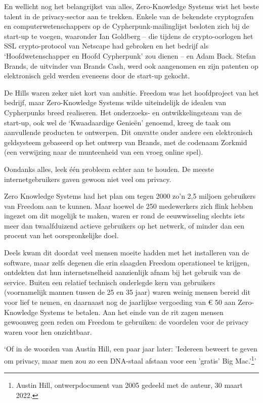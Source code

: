 \documentclass[
  a5paper,
  smalldemyvopaper,11pt,twoside,onecolumn,openright,extrafontsizes]{memoir}
\begin{document}
En wellicht nog het belangrijkst van alles, Zero-Knowledge Systems wist
het beste talent in de privacy-sector aan te trekken. Enkele van de
bekendste cryptografen en computerwetenschappers op de
Cypherpunk-mailinglijst besloten zich bij de start-up te voegen,
waaronder Ian Goldberg -- die tijdens de crypto-oorlogen het SSL
crypto-protocol van Netscape had gebroken en het bedrijf als
`Hoofdwetenschapper en Hoofd Cypherpunk' zou dienen -- en Adam Back.
Stefan Brands, de uitvinder van Brands Cash, werd ook aangenomen en zijn
patenten op elektronisch geld werden eveneens door de start-up gekocht.

De Hills waren zeker niet kort van ambitie. Freedom was het hoofdproject
van het bedrijf, maar Zero-Knowledge Systems wilde uiteindelijk de
idealen van Cypherpunks breed realiseren. Het onderzoeks- en
ontwikkelingsteam van de start-up, ook wel de `Kwaadaardige Genieën'
genoemd, kreeg de taak om aanvullende producten te ontwerpen. Dit
omvatte onder andere een elektronisch geldsysteem gebaseerd op het
ontwerp van Brands, met de codenaam Zorkmid (een verwijzing naar de
munteenheid van een vroeg online spel).

Oondanks alles, leek één probleem echter aan te houden. De meeste
internetgebruikers gaven gewoon niet veel om privacy.

Zero Knowledge Systems had het plan om tegen 2000 zo'n 2,5 miljoen
gebruikers van Freedom aan te kunnen. Maar hoewel de 250 medewerkers
zich flink hebben ingezet om dit mogelijk te maken, waren er rond de
eeuwwisseling slechts iets meer dan twaalfduizend actieve gebruikers op
het netwerk, of minder dan een procent van het oorspronkelijke doel.

Deels kwam dit doordat veel mensen moeite hadden met het installeren van
de software, maar zelfs degenen die erin slaagden Freedom operationeel
te krijgen, ontdekten dat hun internetsnelheid aanzienlijk afnam bij het
gebruik van de service. Buiten een relatief technisch onderlegde kern
van gebruikers (voornamelijk mannen tussen de 25 en 35 jaar) waren
weinig mensen bereid dit voor lief te nemen, en daarnaast nog de
jaarlijkse vergoeding van € 50 aan Zero-Knowledge Systems te betalen.
Aan het einde van de rit zagen mensen gewoonweg geen reden om Freedom te
gebruiken: de voordelen voor de privacy waren voor hen onzichtbaar.

`Of in de woorden van Austin Hill, een paar jaar later: 'Iedereen
beweert te geven om privacy, maar men zou zo een DNA-staal afstaan voor
een 'gratis' Big Mac.'\footnote{Austin Hill, ontwerpdocument van 2005
  gedeeld met de auteur, 30 maart 2022.}'
\end{document}
